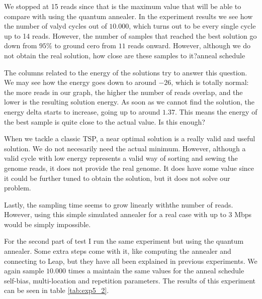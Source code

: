 We stopped at 15 reads since that is the maximum value that will be able to compare with using the quantum annealer. In the experiment results we see how the number of valyd cycles out of $10.000$, which turns out to be every single cycle up to 14 reads. However, the number of samples that reached the best solution go down from $95\%$ to ground cero from $11$ reads onward. However, although we do not obtain the real solution, how close are these samples to it?anneal schedule 

The columns related to the energy of the solutions try to answer this question. We may see how the energy goes down to around $-26$, which is totally normal: the more reads in our graph, the higher the number of reads overlap, and the lower is the resulting solution energy. As soon as we cannot find the solution, the energy delta starts to increase, going up to around $1.37$. This means the energy of the best sample is quite close to the actual value. Is this enough?

When we tackle a classic TSP, a near optimal solution is a really valid and useful solution. We do not necesarily need the actual minimum. However, although a valid cycle with low energy represents a valid way of sorting and sewing the genome reads, it does not provide the real genome. It does have some value since it could be further tuned to obtain the solution, but it does not solve our problem.

Lastly, the sampling time seems to grow linearly withthe number of reads. However, using this simple simulated annealer for a real case with up to 3 Mbps would be simply impossible.

For the second part of test  I run the same experiment but using the quantum annealer. Some extra steps come with it, like computing the annealer and connecting to Leap, but they have all been explained in previous experiments. We again sample $10.000$ times a maintain the same values for the anneal schedule self-bias, multi-location and repetition parameters. The results of this experiment can be seen in table \ref{tab:exp5_2}.

